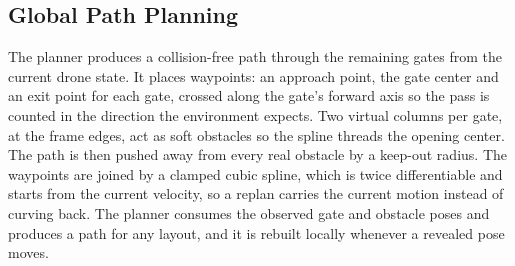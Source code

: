 \documentclass[conference]{IEEEtran}
\begin{document}
\subsection{Global Path Planning}
\label{sec:plan}
The planner produces a collision-free path through the remaining gates from the current drone state. It places waypoints: an approach point, the gate center and an exit point for each gate, crossed along the gate's forward axis so the pass is counted in the direction the environment expects. Two virtual columns per gate, at the frame edges, act as soft obstacles so the spline threads the opening center. The path is then pushed away from every real obstacle by a keep-out radius. The waypoints are joined by a clamped cubic spline, which is twice differentiable and starts from the current velocity, so a replan carries the current motion instead of curving back. The planner consumes the observed gate and obstacle poses and produces a path for any layout, and it is rebuilt locally whenever a revealed pose moves.
\end{document}

